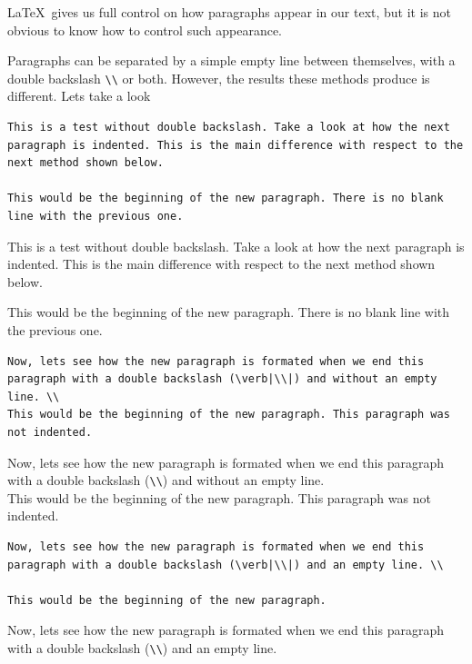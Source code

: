 \LaTeX\ gives us full control on how paragraphs appear in our text, but it is not obvious to know how to control such appearance.

Paragraphs can be separated by a simple empty line between themselves, with a double backslash \verb|\\| or both. However, the results these methods produce is different. Lets take a look

\begin{lstlisting}[language={[LaTeX]TeX}]
This is a test without double backslash. Take a look at how the next paragraph is indented. This is the main difference with respect to the next method shown below.

This would be the beginning of the new paragraph. There is no blank line with the previous one.
\end{lstlisting}

This is a test without double backslash. Take a look at how the next paragraph is indented. This is the main difference with respect to the next method shown below.

This would be the beginning of the new paragraph. There is no blank line with the previous one.

\begin{lstlisting}[language={[LaTeX]TeX}]
Now, lets see how the new paragraph is formated when we end this paragraph with a double backslash (\verb|\\|) and without an empty line. \\
This would be the beginning of the new paragraph. This paragraph was not indented.
\end{lstlisting}

Now, lets see how the new paragraph is formated when we end this paragraph with a double backslash (\verb|\\|) and without an empty line. \\
This would be the beginning of the new paragraph. This paragraph was not indented.

\begin{lstlisting}[language={[LaTeX]TeX}]
Now, lets see how the new paragraph is formated when we end this paragraph with a double backslash (\verb|\\|) and an empty line. \\

This would be the beginning of the new paragraph.
\end{lstlisting}

Now, lets see how the new paragraph is formated when we end this paragraph with a double backslash (\verb|\\|) and an empty line. \\

